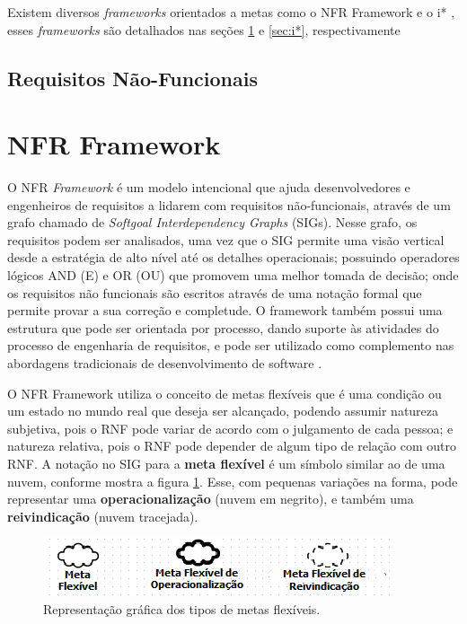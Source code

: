 Existem diversos \textit{frameworks} orientados a metas como o NFR Framework \cite{chung2012non} e o i* \cite{istarwiki20}, esses \textit{frameworks} são detalhados nas seções \ref{sec:NFR} e \ref{sec:i*}, respectivamente
\subsection{Requisitos Não-Funcionais}



\section{NFR Framework}
\label{sec:NFR}

O NFR \textit{Framework}  é um modelo intencional que ajuda desenvolvedores e engenheiros de requisitos a lidarem com requisitos não-funcionais, através de um grafo chamado de \textit{Softgoal Interdependency Graphs} (SIGs). Nesse grafo, os requisitos podem ser analisados, uma vez que o SIG permite uma visão vertical desde a estratégia de alto nível até os detalhes operacionais;  possuindo operadores lógicos AND (E) e OR (OU) que promovem uma melhor tomada de decisão; onde  os requisitos não funcionais são escritos através de uma notação formal que permite provar a sua correção e completude. O framework também possui uma estrutura que pode ser orientada por processo, dando suporte às atividades do processo de engenharia de requisitos, e pode ser utilizado como complemento nas abordagens tradicionais de desenvolvimento de software \cite{chung2012non}.

O NFR Framework utiliza o conceito de metas flexíveis que é uma condição ou um estado no mundo real que deseja ser alcançado, podendo assumir natureza subjetiva, pois o RNF pode variar de acordo com o julgamento de cada pessoa; e natureza relativa, pois o RNF pode depender de algum tipo de relação com outro RNF.  A notação no SIG para a \textbf{meta flexível} é um símbolo similar ao de uma nuvem, conforme mostra a figura \ref{fig01}. Esse, com pequenas variações na forma, pode representar uma \textbf{operacionalização} (nuvem em negrito), e também uma \textbf{reivindicação} (nuvem tracejada).

\begin{figure}[h]
	\centering
	\includegraphics[keepaspectratio=true,scale=0.9]{figuras/tiposDeSoftgoals.png}
	\caption{Representação gráfica dos tipos de metas flexíveis.}
	\label{fig01}
\end{figure} 

